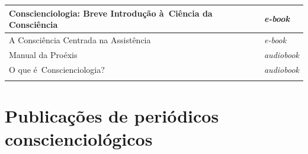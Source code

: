 \documentclass{gescons}
\begin{document}
\begin{longtable}[]{@{}
  >{\raggedright\arraybackslash}p{}
  >{\raggedright\arraybackslash}p{}@{}}
\hline
\begin{minipage}[t]{\linewidth}\raggedright
Conscienciologia: Breve Introdução à~Ciência da Consciência
\end{minipage} & \begin{minipage}[t]{\linewidth}\centering
\emph{e-book}
\end{minipage} \\
\hline
\begin{minipage}[t]{\linewidth}\raggedright
A Consciência Centrada na Assistência
\end{minipage} & \begin{minipage}[t]{\linewidth}\centering
\emph{e-book}
\end{minipage} \\
\hline
\begin{minipage}[t]{\linewidth}\raggedright
Manual da Proéxis
\end{minipage} & \begin{minipage}[t]{\linewidth}\centering
\emph{audiobook}
\end{minipage} \\
\hline
\begin{minipage}[t]{\linewidth}\raggedright
O que é~Conscienciologia?
\end{minipage} & \begin{minipage}[t]{\linewidth}\centering
\emph{audiobook}
\end{minipage} \\
\midrule\noalign{}
\endhead
\bottomrule\noalign{}
\endlastfoot
\end{longtable}


















\section*{Publicações de periódicos conscienciológicos}
\end{document}
